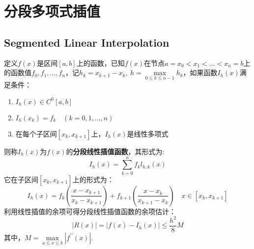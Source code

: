 \newpage
\section{分段多项式插值}
\subsection{Segmented Linear Interpolation}
定义$f(x)$是区间$[a,b]$上的函数，已知$f(x)$在节点$a=x_0<x_1<\dots <x_n=b$上的函数值$f_0,f_1,\dots,f_n$，记$h_k=x_{k+1}-x_k,\ h=\max\limits_{0\leqslant k\leqslant n-1}h_k$，如果函数$I_h(x)$满足条件：
\begin{enumerate}
	\item $I_h(x) \in C^0[a,b]$
	\item $I_h(x_k) = f_k\quad (k=0,1,\dots,n)$
	\item 在每个子区间$[x_k,x_{k+1}]$上，$I_h(x)$是线性多项式
\end{enumerate}
则称$I_h(x)$为$f(x)$的\textbf{分段线性插值函数}，其形式为:
\begin{equation}
I_h(x) = \sum\limits_{k=0}^n f_k l_{h,k}(x)
\end{equation}
它在子区间$[x_k,x_{k+1}]$上的形式为：
\begin{equation}
I_h(x) = f_k(\frac{x-x_{k+1}}{x_k-x_{k+1}})+f_{k+1}(\frac{x-x_k}{x_{k+1}-x_k})\quad x\in [x_k,x_{k+1}]
\end{equation}
利用线性插值的余项可得分段线性插值函数的余项估计：
\begin{equation}
\left| R(x)\right| = \left| f(x) - I_h(x) \right| \leqslant \frac{h^2}{8}M
\end{equation}
其中，$M=\max\limits_{a\leqslant x\leqslant b}\left| f^{\prime \prime}(x)\right|$.


